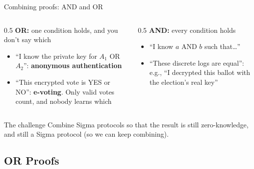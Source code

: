 \ifdefined\PRESENTATION\else\PassOptionsToClass{handout}{beamer}\fi\documentclass[aspectratio=169, lualatex]{beamer}
\begin{document}
\begin{frame}{Combining proofs: AND and OR}
	\begin{columns}[T]
		\begin{column}{0.5\textwidth}
			\textbf{OR:} one condition holds, and you don't say which
			\begin{itemize}
				\item ``I know the private key for $A_1$ OR $A_2$'': \textbf{anonymous authentication}
				\item ``This encrypted vote is YES or NO'': \textbf{e-voting}. Only valid votes count, and nobody learns which
			\end{itemize}
		\end{column}
		\begin{column}{0.5\textwidth}
			\textbf{AND:} every condition holds
			\begin{itemize}
				\item ``I know $a$ AND $b$ such that\ldots''
				\item ``These discrete logs are equal'': e.g., ``I decrypted this ballot with the election's real key''
			\end{itemize}
		\end{column}
	\end{columns}
	\vspace{0.2cm}
	\begin{alertblock}{The challenge}
		Combine Sigma protocols so that the result is still zero-knowledge, and still a Sigma protocol (so we can keep combining).
	\end{alertblock}
\end{frame}

\subsection{OR Proofs}
\end{document}

